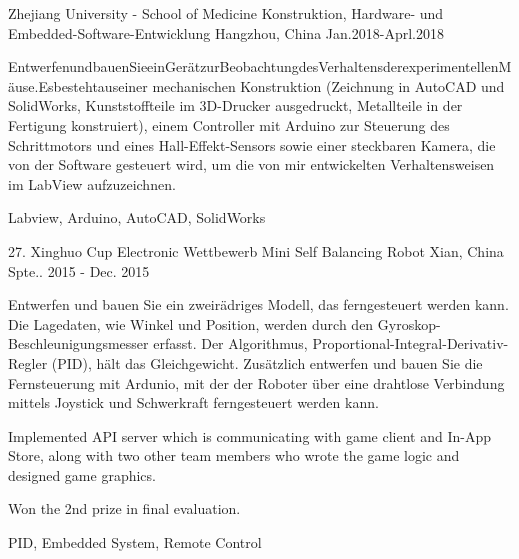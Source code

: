 \begin{cventries}
  \cventry
    {Zhejiang University - School of Medicine} %
    {Konstruktion, Hardware- und Embedded-Software-Entwicklung} %
    {Hangzhou, China} %
    {Jan.2018-Aprl.2018} %
    {
      \begin{cvitems} %
        \item {EntwerfenundbauenSieeinGerätzurBeobachtungdesVerhaltensderexperimentellenMäuse.Esbestehtauseiner mechanischen Konstruktion (Zeichnung in AutoCAD und SolidWorks, Kunststoffteile im 3D-Drucker ausgedruckt, Metallteile in der Fertigung konstruiert), einem Controller mit Arduino zur Steuerung des Schrittmotors und eines Hall-Effekt-Sensors sowie einer steckbaren Kamera, die von der Software gesteuert wird, um die von mir entwickelten Verhaltensweisen im LabView aufzuzeichnen.}
      \end{cvitems}
    }{Labview, Arduino, AutoCAD, SolidWorks}

  \cventry
    {27. Xinghuo Cup Electronic Wettbewerb} %
    {Mini Self Balancing Robot} %
    {Xian, China} %
    {Spte.. 2015 - Dec. 2015} %
    {
      \begin{cvitems} %
        \item {Entwerfen und bauen Sie ein zweirädriges Modell, das ferngesteuert werden kann. Die Lagedaten, wie Winkel und Position, werden durch den Gyroskop-Beschleunigungsmesser erfasst. Der Algorithmus, Proportional-Integral-Derivativ-Regler (PID), hält das Gleichgewicht. Zusätzlich entwerfen und bauen Sie die Fernsteuerung mit Ardunio, mit der der Roboter über eine drahtlose Verbindung mittels Joystick und Schwerkraft ferngesteuert werden kann.}
        \item {Implemented API server which is communicating with game client and In-App Store, along with two other team members who wrote the game logic and designed game graphics.}
        \item {Won the 2nd prize in final evaluation.}
      \end{cvitems}
    }{PID, Embedded System, Remote Control}

\end{cventries}
